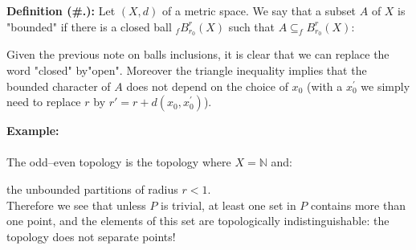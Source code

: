 	\textbf{Definition (\#\thesection.\mydef):} Let $(X,d)$ of a metric space. We say that a subset $A$ of $X$ is "bounded" if there is a closed ball $_fB_{r_0}^r(X)$ such that $A \subseteq _fB_{r_0}^r(X)$:
	
	Given the previous note on balls inclusions, it is clear that we can replace the word "closed" by"open". Moreover the triangle inequality implies that the bounded character of $A$ does not depend on the choice of $x_0$ (with a $x_0^{\prime}$ we simply need to replace $r$ by $r'=r+d\left(x_0,x_0^{\prime}\right)$).
	\begin{tcolorbox}[colframe=black,colback=white,sharp corners]
	\textbf{{\Large {}}Example:}\\\\
	The odd–even topology is the topology where $X = \mathbb{N}$ and:
	
	the unbounded partitions of radius $r<1$. \\
	
	 Therefore we see that unless $P$ is trivial, at least one set in $P$ contains more than one point, and the elements of this set are topologically indistinguishable: the topology does not separate points!
	\end{tcolorbox}
	
